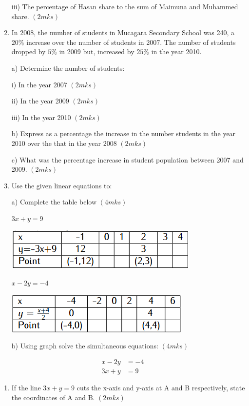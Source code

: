 \documentclass[
  a4paperpaper,
]{scrbook}
\providecommand{\tightlist}{%
  \setlength{\itemsep}{0pt}\setlength{\parskip}{0pt}}\usepackage{longtable,booktabs,array}
\begin{document}
\begin{tcolorbox}
\begin{enumerate}
  iii) The percentage of Hasan share to the sum of Maimuna and Muhammed
  share. \((2mks)\)
\item
  In 2008, the number of students in Mucagara Secondary School was 240,
  a \(20\%\) increase over the number of students in 2007. The number of
  students dropped by \(5\%\) in 2009 but, increased by \(25\%\) in the
  year 2010.

  a) Determine the number of students:

  i) In the year 2007 \((2mks)\)

  ii) In the year 2009 \((2mks)\)

  iii) In the year 2010 \((2mks)\)

  b) Express as a percentage the increase in the number students in the
  year 2010 over the that in the year 2008 \((2mks)\)

  c) What was the percentage increase in student population between 2007
  and 2009. \((2mks)\)
\item
  Use the given linear equations to:

  a) Complete the table below \((4mks)\)

  \(3x+y=9\)

  \includegraphics{figures/Md7_Q20a.png}

  \(x-2y=-4\)

  \includegraphics{figures/Md7_Q20b.png}

  b) Using graph solve the simultaneous equations: \((4mks)\)
\end{enumerate}

\begin{equation}
\begin{split}
x-2y&= -4\\
3x+y&=9
\end {split}
\end{equation}

\begin{enumerate}
\def\labelenumi{\alph{enumi})}
\setcounter{enumi}{2}
\tightlist
\item
  If the line \(3x+y= 9\) cuts the x-axis and y-axis at A and B
  respectively, state the coordinates of A and B. \((2mks)\)
\end{enumerate}


\end{tcolorbox}
\end{document}
